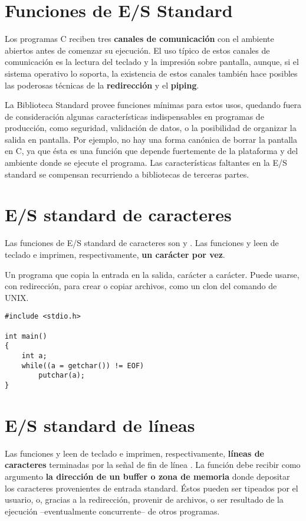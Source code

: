 \section{Funciones de E/S Standard}
\label{sec:esstandard}
Los programas C reciben tres \textbf{canales de comunicación} con el ambiente abiertos
antes de comenzar su ejecución. El uso típico de estos canales de comunicación
es la lectura del teclado y la impresión sobre pantalla, aunque, si el sistema
operativo lo soporta, la existencia de estos canales también hace posibles las poderosas técnicas de la
\textbf{redirección} y el \textbf{piping}. 


La Biblioteca Standard provee funciones mínimas para estos usos,
quedando fuera de consideración algunas características indispensables en
programas de producción, como seguridad, validación de datos, o la posibilidad de
organizar la salida en pantalla. Por ejemplo, no hay una forma canónica de
borrar la pantalla en C, ya que ésta es una función que depende fuertemente de
la plataforma y del ambiente donde se ejecute el programa. Las características faltantes en la
E/S standard se compensan recurriendo a bibliotecas de terceras partes.

\section{E/S standard de caracteres}
\label{subsec:esstandardcaract}
Las funciones de E/S standard de caracteres son  y . Las funciones  y  leen de teclado e imprimen, respectivamente, \textbf{un carácter por vez}.

\begin{ejemplo}
Un programa que copia la entrada en la salida, carácter a
carácter. Puede usarse, con redirección, para crear o copiar archivos, como un
clon del comando  de UNIX.

\begin{lstlisting}
#include <stdio.h>

int main()
{
    int a;
    while((a = getchar()) != EOF)
        putchar(a);
}
\end{lstlisting}
\end{ejemplo}

\section{E/S standard de líneas}
\label{subsec:esstandardlineas}
Las funciones  y  leen de teclado e imprimen, respectivamente,
\textbf{líneas de caracteres} terminadas por la señal de fin de línea \code{\n}. La función
 debe recibir como argumento \textbf{la dirección de un buffer o zona de memoria}
donde depositar los caracteres provenientes de entrada standard. Éstos pueden ser tipeados por 
el usuario, o, gracias a la redirección, provenir de archivos, o ser
resultado de la ejecución --eventualmente concurrente-- de otros programas. 

